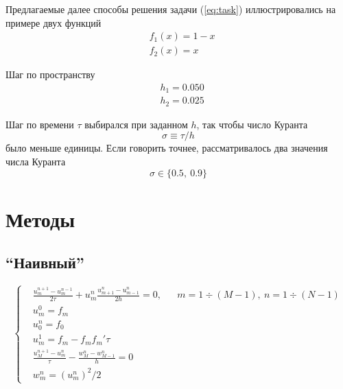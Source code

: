 \documentclass[a4paper,12pt]{article}
\begin{document}
  \jp
  Предлагаемые далее способы решения задачи (\ref{eq:task}) иллюстрировались на примере двух функций
  \begin{equation}
    \begin{aligned}
      &f_1(x) = 1 - x\\
      &f_2(x) = x
    \end{aligned}
    \label{eq:funcs}
  \end{equation}
  
  \jp
  Шаг по пространству
  \begin{equation}
    \begin{aligned}
      &h_1 = 0.050\\
      &h_2 = 0.025
    \end{aligned}
    \label{eq:steps}
  \end{equation}
  
  \jp
  Шаг по времени $\tau$ выбирался при заданном $h$, так чтобы число Куранта
  \begin{equation}
    \sigma \equiv \tau \Big/ h
  \end{equation}
  было меньше единицы.
  Если говорить точнее, рассматривалось два значения числа Куранта
  \begin{equation}
    \sigma \in \{0.5,\ 0.9\}
    \label{eq:cours}
  \end{equation}
  \newpage
  
\section{Методы}

\subsection{"`Наивный"'}
\label{sec:silly}
  \begin{equation}
    \left\{
    \begin{aligned}
      &\frac{u_m^{n+1} - u_m^{n-1}}{2 \tau} + u_m^n \frac{u_{m+1}^n - u_{m-1}^n}{2h} = 0, & &m = 1 \div (M-1),\ 
        n = 1 \div (N-1)\\
      &u_m^0 = f_m & &{}\\
      &u_0^n = f_0 & &{}\\
      &u_m^1 = f_m - f_m f_m' \tau & &{}\\
      &\frac{u_M^{n+1} - u_m^n}{\tau} - \frac{w_M^n - w_{M-1}^n}{h} = 0 & &{}\\
      &w_m^n = (u_m^n)^2 \Big/ 2 & &{}
    \end{aligned}
    \right.
    \label{eq:silly}
  \end{equation}
  
\end{document}
